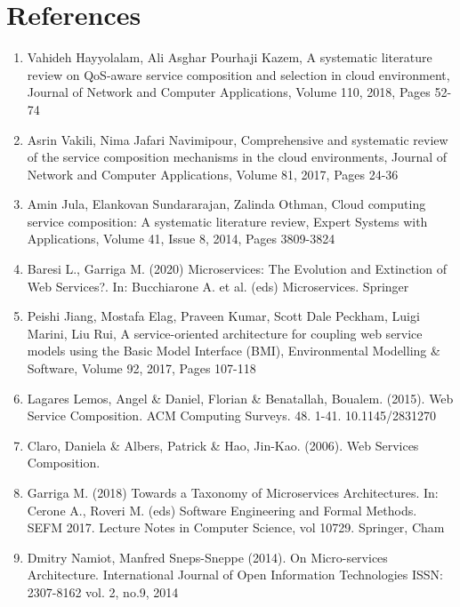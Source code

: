 \documentclass{article}
\begin{document}
\section{References}

\begin{enumerate}

\item Vahideh Hayyolalam, Ali Asghar Pourhaji Kazem, A systematic literature review on QoS-aware service composition and selection in cloud environment, Journal of Network and Computer Applications, Volume 110, 2018, Pages 52-74



\item Asrin Vakili, Nima Jafari Navimipour, Comprehensive and systematic review of the service composition mechanisms in the cloud environments, Journal of Network and Computer Applications, Volume 81, 2017, Pages 24-36

\item Amin Jula, Elankovan Sundararajan, Zalinda Othman, Cloud computing service composition: A systematic literature review, Expert Systems with Applications, Volume 41, Issue 8, 2014,
Pages 3809-3824

\item Baresi L., Garriga M. (2020) Microservices: The Evolution and Extinction of Web Services?. In: Bucchiarone A. et al. (eds) Microservices. Springer

\item Peishi Jiang, Mostafa Elag, Praveen Kumar, Scott Dale Peckham, Luigi Marini, Liu Rui,
A service-oriented architecture for coupling web service models using the Basic Model Interface (BMI), Environmental Modelling \& Software, Volume 92, 2017, Pages 107-118

\item Lagares Lemos, Angel \& Daniel, Florian \& Benatallah, Boualem. (2015). Web Service Composition. ACM Computing Surveys. 48. 1-41. 10.1145/2831270

\item Claro, Daniela \& Albers, Patrick \& Hao, Jin-Kao. (2006). Web Services Composition. 

\item Garriga M. (2018) Towards a Taxonomy of Microservices Architectures. In: Cerone A., Roveri M. (eds) Software Engineering and Formal Methods. SEFM 2017. Lecture Notes in Computer Science, vol 10729. Springer, Cham

\item Dmitry Namiot, Manfred Sneps-Sneppe (2014). On Micro-services Architecture. International Journal of Open Information Technologies ISSN: 2307-8162 vol. 2, no.9, 2014


\end{enumerate}
\end{document}
